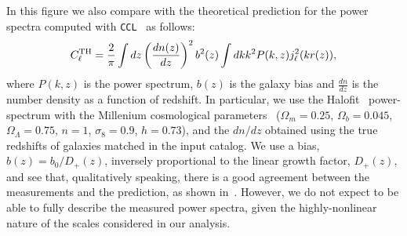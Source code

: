 \documentclass[\docopts]{\docclass}
\begin{document}
In this figure we also compare with the theoretical prediction for the power spectra computed with \texttt{CCL}~\citep{2019ApJS..242....2C} as follows:
\begin{equation}
C_{\ell}^{\rm TH} = \frac{2}{\pi}\int{dz} \left(\frac{dn(z)}{dz}\right)^{2} b^{2}(z) \int{dk k^{2} P(k,z)j^{2}_{\ell}(kr(z))},
\end{equation}
where $P(k,z)$ is the power spectrum, $b(z)$ is the galaxy bias and $\frac{dn}{dz}$ is the number density as a function of redshift. In particular, we use the Halofit~\citep{2012ApJ...761..152T} power-spectrum with the Millenium cosmological parameters~\citep{2005Nature.435.629S} ($\Omega_{m}=0.25$, $\Omega_{b}=0.045$, $\Omega_{\Lambda}=0.75$, $n=1$, $\sigma_{8}=0.9$, $h=0.73$), and the $dn/dz$ obtained using the true redshifts of galaxies matched in the input catalog. We use a bias, $b(z) = b_{0}/D_{+}(z)$, inversely proportional to the linear growth factor, $D_{+}(z)$, and see that, qualitatively speaking, there is a good agreement between the measurements and the prediction, as shown in~. %
However, we do not expect to be able to fully describe the measured power spectra, given the highly-nonlinear nature of the scales considered in our analysis.
\end{document}
